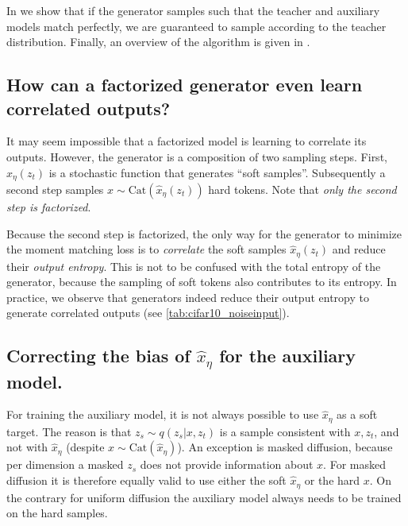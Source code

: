 In  we show that if the generator samples such that the teacher and auxiliary models match perfectly, we are guaranteed to sample according to the teacher distribution. Finally, an overview of the algorithm is given in .

\subsection{How can a factorized generator even learn correlated outputs?}
It may seem impossible that a factorized model is learning to correlate its outputs. However, the generator is a composition of two sampling steps. First, $\hat{x}_\eta(z_t)$ is a stochastic function that generates ``soft samples''. Subsequently a second step samples $x \sim \mathrm{Cat}(\hat{x}_\eta(z_t))$ hard tokens. Note that \textit{only the second step is factorized}.

Because the second step is factorized, the only way for the generator to minimize the moment matching loss is to \textit{correlate} the soft samples $\hat{x}_\eta(z_t)$ and reduce their \textit{output entropy}. This is not to be confused with the total entropy of the generator, because the sampling of soft tokens also contributes to its entropy. In practice, we observe that generators indeed reduce their output entropy to generate correlated outputs (see \autoref{tab:cifar10_noiseinput}).

\subsection{Correcting the bias of $\hat{x}_\eta$ for the auxiliary model.}
For training the auxiliary model, it is not always possible to use $\hat{x}_\eta$ as a soft target.
The reason is that $z_s \sim q(z_s | x, z_t)$ is a sample consistent with $x, z_t$, and not with $\hat{x}_\eta$ (despite $x \sim \mathrm{Cat}(\hat{x}_\eta)$). An exception is masked diffusion, because per dimension a masked $z_s$ does not provide information about $x$. For masked diffusion it is therefore equally valid to use either the soft $\hat{x}_\eta$ or the hard $x$. On the contrary for uniform diffusion the auxiliary model always needs to be trained on the hard samples.


